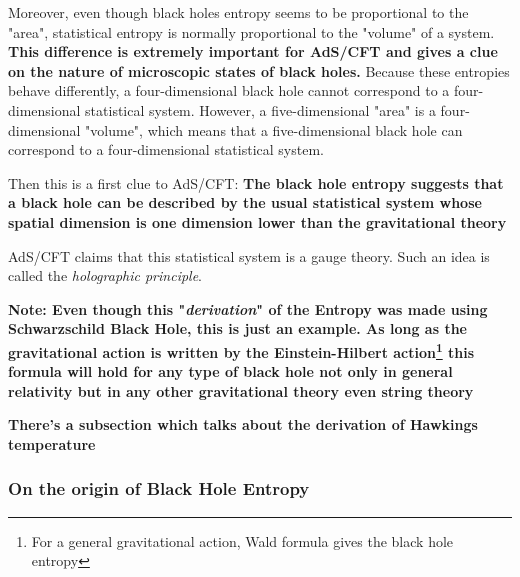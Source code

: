 \documentclass[12pt]{article}
\begin{document}
\vspace{.25cm}

Moreover, even though black holes entropy seems to be proportional to the "area", statistical entropy is normally proportional to the "volume" of a system. \textbf{This difference is extremely important for AdS/CFT and gives a clue on the nature of microscopic states of black holes.} Because these entropies behave differently, a four-dimensional black hole cannot correspond to a four-dimensional statistical system. However, a five-dimensional "area" is a four-dimensional "volume", which means that a five-dimensional black hole can correspond to a four-dimensional statistical system.

\vspace{.25cm}

Then this is a first clue to AdS/CFT: \textbf{The black hole entropy suggests that a black hole can be described by the usual statistical system whose spatial dimension is one dimension lower than the gravitational theory}

\vspace{.25cm}

AdS/CFT claims that this statistical system is a gauge theory. Such an idea is called the \textit{holographic principle}. 

\vspace{.25cm}

\textbf{Note: Even though this "\textit{derivation}" of the Entropy was made using Schwarzschild Black Hole, this is just an example. As long as the gravitational action is written by the Einstein-Hilbert action\footnote{For a general gravitational action, Wald formula gives the black hole entropy} this formula will hold for any type of black hole not only in general relativity but in any other gravitational theory even string theory} 

\textbf{There's a subsection which talks about the derivation of Hawkings temperature}

\subsubsection{On the origin of Black Hole Entropy}
\end{document}
